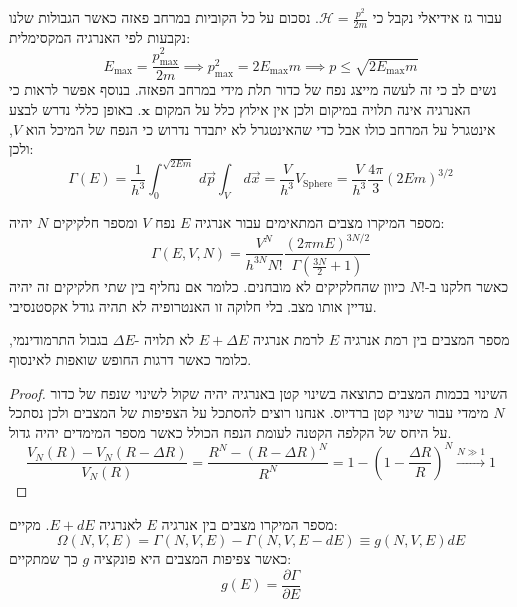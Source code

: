\documentclass{tstextbook}
\begin{document}
\begin{example}
עבור גז אידיאלי נקבל כי \(\mathcal{H}= \frac{p^{2}}{2m}\). נסכום על כל הקוביות במרחב פאזה כאשר הגבולות שלנו נקבעות לפי האנרגיה המקסימלית:
$$E_{\max }=\frac{p_{\max }^{2}}{2m}\implies p_{\max }^{2}=2E_{\max }m\implies p\leq \sqrt{ 2E_{\max }m }$$
נשים לב כי זה לעשה מייצג נפח של כדור תלת מידי במרחב הפאזה. בנוסף אפשר לראות כי האנרגיה אינה תלויה במיקום ולכן אין אילוץ כלל על המקום \(\mathbf{x}\). באופן כללי נדרש לבצע אינטגרל על המרחב כולו אבל כדי שהאינטגרל לא יתבדר נדרוש כי הנפח של המיכל הוא \(V\), ולכן:
$$\Gamma(E)=\frac{1}{h^{3}}\int_{0}^{\sqrt{ 2Em }}  \, d\vec{p} \int_{V}  \, d\vec{x}=  \frac{V}{h^{3}}V_{\text{Sphere}}=\frac{V}{h^{3}} \frac{4\pi}{3}(2Em)^{3/2}$$

\end{example}
\begin{corollary}
מספר המיקרו מצבים המתאימים עבור אנרגיה \(E\) נפח \(V\) ומספר חלקיקים \(N\) יהיה:
$$\Gamma(E,V,N)=\frac{V^{N}}{h^{3N}N!}\frac{\left( 2\pi m E \right)^{3N/2}}{\Gamma\left(\frac{3N}{2}+1\right)}$$
כאשר חלקנו ב-\(N!\) כיוון שהחלקיקים לא מובחנים. כלומר אם נחליף בין שתי חלקיקים זה יהיה עדיין אותו מצב. בלי חלוקה זו האנטרופיה לא תהיה גודל אקסטנסיבי.

\end{corollary}
\begin{proposition}
מספר המצבים בין רמת אנרגיה \(E\) לרמת אנרגיה \(E+\Delta E\) לא תלויה -\(\Delta E\) בגבול התרמודינמי, כלומר כאשר דרגות החופש שואפות לאינסוף.

\end{proposition}
\begin{proof}
השינוי בכמות המצבים כתוצאה בשינוי קטן באנרגיה יהיה שקול לשינוי שנפח של כדור \(N\) מימדי עבור שינוי קטן ברדיוס. אנחנו רוצים להסתכל על הצפיפות של המצבים ולכן נסתכל על היחס של הקלפה הקטנה לעומת הנפח הכולל כאשר מספר המימדים יהיה גדול.
$$\frac{V_{N}(R)-V_{N}\left( R-\Delta R \right)}{V_{N}(R)}=\frac{R^{N}-\left( R-\Delta R \right)^{N}}{R^{N}}= 1-\left( 1-\frac{\Delta R}{R} \right)^{N}\xrightarrow{N\gg 1} 1$$

\end{proof}
\begin{definition}
מספר המיקרו מצבים בין אנרגיה \(E\) לאנרגיה \(E+dE\). מקיים:
$$\Omega\left(N,V,E\right)=\Gamma\left(N,V,E\right)-\Gamma\left(N,V,E-d E\right)\equiv g\left(N,V,E\right)d E$$
כאשר צפיפות המצבים היא פונקציה \(g\) כך שמתקיים:
$$g(E)=\frac{\partial \Gamma}{\partial E} $$

\end{definition}
\end{document}
